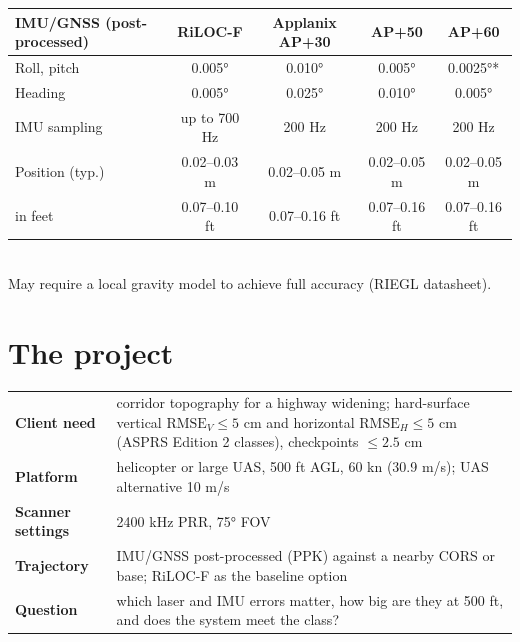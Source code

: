 \begin{center}\footnotesize
\renewcommand{\arraystretch}{1.18}
\begin{tabular}{lcccc}\toprule
\textbf{IMU/GNSS (post-processed)} & \textbf{RiLOC-F} & \textbf{Applanix AP+30} & \textbf{AP+50} & \textbf{AP+60}\\\midrule
Roll, pitch & 0.005° & 0.010° & 0.005° & 0.0025°*\\
Heading & 0.005° & 0.025° & 0.010° & 0.005°\\
IMU sampling & up to 700 Hz & 200 Hz & 200 Hz & 200 Hz\\
Position (typ.) & 0.02--0.03 m & 0.02--0.05 m & 0.02--0.05 m & 0.02--0.05 m\\
\quad in feet & 0.07--0.10 ft & 0.07--0.16 ft & 0.07--0.16 ft & 0.07--0.16 ft\\\bottomrule
\end{tabular}\\[2pt]
{\footnotesize *May require a local gravity model to achieve full accuracy (RIEGL datasheet).}
\end{center}

\section{The project}
\begin{center}\small
\renewcommand{\arraystretch}{1.2}
\begin{tabularx}{\linewidth}{>{\bfseries}p{3.0cm}X}\toprule
Client need & corridor topography for a highway widening; hard-surface vertical $\text{RMSE}_V\le5$ cm and horizontal $\text{RMSE}_H\le5$ cm (ASPRS Edition 2 classes), checkpoints $\le2.5$ cm\\
Platform & helicopter or large UAS, 500 ft AGL, 60 kn (30.9 m/s); UAS alternative 10 m/s\\
Scanner settings & 2400 kHz PRR, 75° FOV\\
Trajectory & IMU/GNSS post-processed (PPK) against a nearby CORS or base; RiLOC-F as the baseline option\\
Question & which laser and IMU errors matter, how big are they at 500 ft, and does the system meet the class?\\\bottomrule
\end{tabularx}\end{center}


